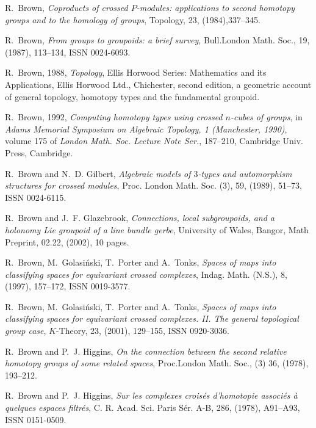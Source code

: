 \documentclass[12pt]{article}
\theoremstyle{plain}
\theoremstyle{definition}
\numberwithin{equation}{section}
\begin{document}
\begin{thebibliography}{99}
R.~Brown, {\em Coproducts of crossed {$P$}-modules: applications
to second homotopy groups and to the homology of groups}, Topology, 23, (1984),337--345.

R.~Brown, {\em From groups to groupoids: a brief survey}, Bull.London Math.  Soc., 19, (1987), 113--134, ISSN 0024-6093.

R.~Brown, 1988, {\em Topology}, Ellis Horwood Series:
Mathematics and its Applications, Ellis Horwood Ltd., Chichester, second edition, a geometric %
account of general topology, homotopy types and the fundamental groupoid.

R.~Brown, 1992, {\em Computing homotopy types using crossed
{$n$}-cubes of  groups}, in {\em Adams Memorial Symposium on Algebraic Topology, 1
  (Manchester, 1990)}, volume 175 of {\em London Math. Soc. Lecture Note
  Ser.\/},  187--210, Cambridge Univ. Press, Cambridge.

R.~Brown and N.~D. Gilbert, {\em Algebraic models of {$3$}-types and automorphism structures for crossed modules}, Proc. London Math. Soc. (3),  59, (1989), 51--73, ISSN 0024-6115.

R.~Brown and J.~F. Glazebrook, {\em Connections, local subgroupoids, and a   holonomy Lie groupoid of a line bundle gerbe}, University of Wales, Bangor,   Math Preprint, 02.22, (2002), 10 pages.

R.~Brown, M.~Golasi{\'n}ski, T.~Porter and A.~Tonks, {\em Spaces
of maps into classifying spaces for equivariant crossed complexes}, Indag. Math. (N.S.),
  8, (1997), 157--172, ISSN 0019-3577.

R.~Brown, M.~Golasi{\'n}ski, T.~Porter and A.~Tonks, {\em Spaces
of maps into classifying spaces for equivariant crossed complexes. {II}. {T}he general %
topological group case}, $K$-Theory, 23, (2001), 129--155, ISSN 0920-3036.

R.~Brown and P.~J. Higgins, {\em On the connection between the
second relative homotopy groups of some related spaces\/}, Proc.London Math. Soc., (3) 36, %
(1978), 193--212.

R.~Brown and P.~J. Higgins, {\em Sur les complexes crois\'es
d'homotopie associ\'es \`a quelques espaces filtr\'es}, C. R. Acad. Sci. Paris S\'er. A-B, %
286, (1978), A91--A93, ISSN 0151-0509.



\end{thebibliography}
\end{document}

